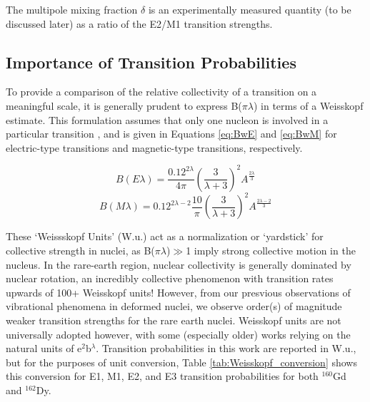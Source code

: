 The multipole mixing fraction $\delta$ is an experimentally measured quantity (to be discussed later) as a ratio of the E2/M1 transition strengths.

\subsection{Importance of Transition Probabilities}\label{sec:redtab}
To provide a comparison of the relative collectivity of a transition on a meaningful scale, it is generally prudent to express B($\pi\lambda$) in terms of a Weisskopf estimate. This formulation assumes that only one nucleon is involved in a particular transition \cite{Wong_text}, and is given in Equations \ref{eq:BwE} and \ref{eq:BwM} for electric-type transitions and magnetic-type transitions, respectively.

\begin{equation}\label{eq:BwE}
B(E\lambda)=\frac{0.12^{2\lambda}}{4\pi}\left(\frac{3}{\lambda+3}\right)^2A^\frac{2\lambda}{3}
\end{equation}
\begin{equation}\label{eq:BwM}
B(M\lambda)=0.12^{2\lambda-2}\frac{10}{\pi}\left(\frac{3}{\lambda+3}\right)^2A^\frac{2\lambda-2}{3}
\end{equation}

These `Weissskopf Units' (W.u.) act as a normalization or `yardstick' for collective strength in nuclei, as B($\pi\lambda$)$\gg$1 imply strong collective motion in the nucleus. In the rare-earth region, nuclear collectivity is generally dominated by nuclear rotation, an incredibly collective phenomenon with transition rates upwards of 100+ Weisskopf units! However, from our presvious observations of vibrational phenomena in deformed nuclei, we observe order(s) of magnitude weaker transition strengths for the rare earth nuclei. Weisskopf units are not universally adopted however, with some (especially older) works relying on the natural units of e$^2$b$^\lambda$. Transition probabilities in this work are reported in W.u., but for the purposes of unit conversion, Table \ref{tab:Weisskopf_conversion} shows this conversion for E1, M1, E2, and E3 transition probabilities for both $^{160}$Gd and $^{162}$Dy.

